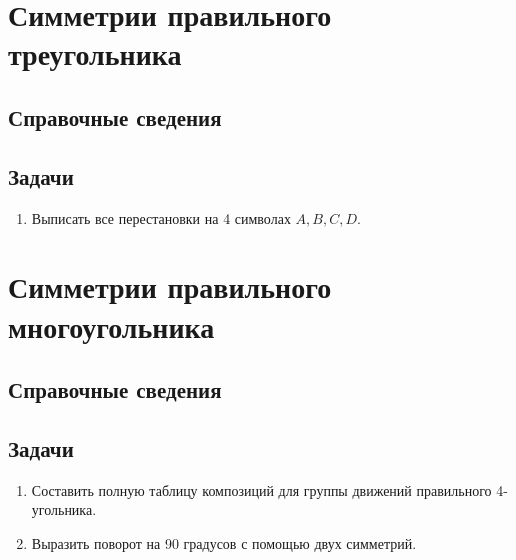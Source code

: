 \section{Симметрии правильного треугольника}

\subsection*{Справочные сведения}

\subsection*{Задачи}
\begin{enumerate}
\item Выписать все перестановки на 4 символах $A,B,C,D$.
\end{enumerate}



\section{Симметрии правильного многоугольника}

\subsection*{Справочные сведения}

\subsection*{Задачи}
\begin{enumerate}
\item Составить полную таблицу композиций для группы движений правильного 4-угольника.
\item Выразить поворот на 90 градусов с помощью двух симметрий.
\end{enumerate}

\label{LinearEqs}



